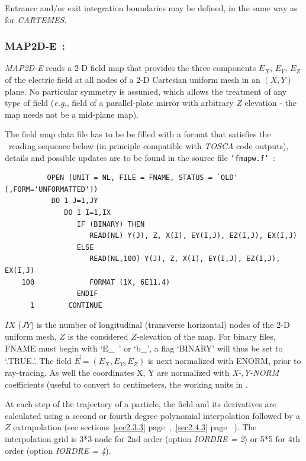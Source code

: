 \medskip

\noindent Entrance and/or 
exit integration boundaries may be defined, in the same way as for \textsl{CARTEMES}.




\newpage

\subsubsection*{MAP2D-E~: \MAPTwoDETitl} \label{MAP2D-E} 
\medskip

\textsl{MAP2D-E} reads a 2-D field map that provides the three
components $ E_X$, $ E_Y $, $ E_Z $ of the electric field at all nodes of a 2-D Cartesian 
uniform mesh in an $(X,Y)$ plane. 
No particular symmetry is assumed, which allows the 
treatment of any type of field (\emph{e.g.},  field of a parallel-plate mirror with arbitrary $Z$ elevation 
- the map needs not be a mid-plane map). 

\medskip

\noindent The field map data file has to be be filled with a 
format that satisfies the  \FORTRAN\ reading sequence below (in principle compatible 
with \textsl{TOSCA} code outputs), details and possible updates are to be found in the source  
file \texttt{'fmapw.f'}~:  

{\footnotesize
\begin{verbatim}
	      OPEN (UNIT = NL, FILE = FNAME, STATUS = `OLD' [,FORM='UNFORMATTED'])
	       DO 1 J=1,JY 
	          DO 1 I=1,IX
	             IF (BINARY) THEN
	                READ(NL) Y(J), Z, X(I), EY(I,J), EZ(I,J), EX(I,J)
	             ELSE
	                READ(NL,100) Y(J), Z, X(I), EY(I,J), EZ(I,J), EX(I,J)
	100             FORMAT (1X, 6E11.4)
	             ENDIF
      1        CONTINUE
\end{verbatim}}
\medskip

\noindent $IX$ ($JY$) is the number of longitudinal (transverse horizontal) nodes of 
the 2-D uniform mesh, $Z$ is the considered $Z$-elevation of the map.   For 
binary files, FNAME must begin with \mbox{`E\_ '} or  \mbox{`b\_'}, a flag  `BINARY' will thus be 
set to `.TRUE.'. The field $ \vec  E=(E_X,E_Y,E_Z )$ is next normalized with 
ENORM, prior to ray-tracing.  As well the coordinates  X, Y are normalized with 
  \textsl{X-,Y-NORM} coefficients (useful to convert to centimeters, the working units in  \zgoubi. 


\medskip

\noindent At each step of the trajectory of a particle, the field and its 
derivatives are calculated using a second or fourth degree polynomial interpolation followed 
by a $ Z $ extrapolation (see sections~\ref{sec2.3.3} page~\pageref{sec2.3.3},~\ref{sec2.4.3} page ~\pageref{sec2.4.3}). 
 The interpolation grid is 3*3-node for 2nd order (option \textsl{IORDRE = 2}) or 5*5 
for 4th order (option \textsl{IORDRE = 4}). 

